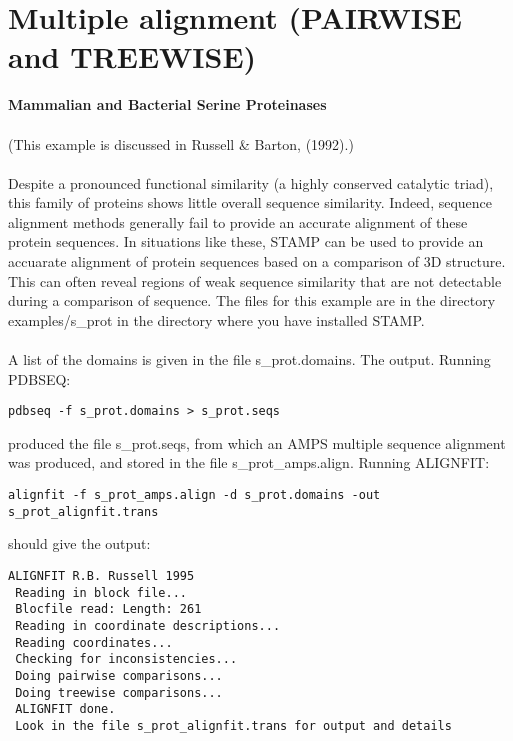 \section{Multiple alignment (PAIRWISE and TREEWISE)}

{\bf Mammalian and Bacterial Serine Proteinases}\\
\\
(This example is discussed in Russell \& Barton, (1992).\nocite{rb92b})\\
\\
Despite a pronounced functional similarity (a highly conserved catalytic 
triad), this family of proteins shows little overall sequence similarity.  
Indeed, sequence alignment methods generally fail to provide an accurate
alignment of these protein sequences.  In situations like these, STAMP 
can be used to provide an accuarate alignment of protein sequences based 
on a comparison of 3D structure.  This can often reveal regions of weak 
sequence similarity that are not detectable during a comparison of 
sequence.  The files for this example are in the directory examples/s\_prot in the 
directory where you have installed STAMP.\\
\\
A list of the domains is given in the file s\_prot.domains. The
output.  Running PDBSEQ:\\

\begin{scriptsize}\begin{verbatim}
pdbseq -f s_prot.domains > s_prot.seqs
\end{verbatim} \end{scriptsize}

produced the file s\_prot.seqs, from which an AMPS multiple
sequence alignment was produced, and stored in the file 
s\_prot\_amps.align.  Running ALIGNFIT:\\

\begin{scriptsize}\begin{verbatim}
alignfit -f s_prot_amps.align -d s_prot.domains -out s_prot_alignfit.trans
\end{verbatim} \end{scriptsize}

should give the output:\\

\begin{scriptsize}\begin{verbatim}
ALIGNFIT R.B. Russell 1995
 Reading in block file...
 Blocfile read: Length: 261
 Reading in coordinate descriptions...
 Reading coordinates...
 Checking for inconsistencies...
 Doing pairwise comparisons...
 Doing treewise comparisons...
 ALIGNFIT done.
 Look in the file s_prot_alignfit.trans for output and details
\end{verbatim} \end{scriptsize}

